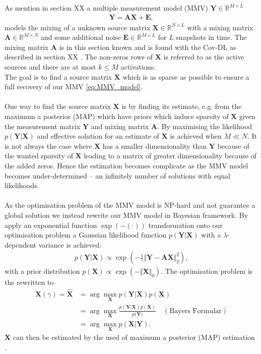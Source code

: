 As mention in section XX a multiple measurement model (MMV) $\mathbf{Y} \in \mathbb{R}^{M \times L}$
\begin{align*}
\mathbf{Y} = \mathbf{AX} + \mathbf{E},
\end{align*}
models the mixing of a unknown source matrix $\mathbf{X} \in \mathbb{R}^{N \times L}$ with a mixing matrix $\mathbf{A} \in \mathbb{R}^{M \times N}$ and some additional noise $\mathbf{E} \in \mathbb{R}^{M \times L}$ for $L$ snapshots in time. The mixing matrix $\mathbf{A}$ is in this section known and is found with the Cov-DL as described in section XX . The non-zeros rows of $\mathbf{X}$ is referred to as the active sources and there are at most $k \leq M$ activations.
\\
The goal is to find a source matrix $\mathbf{X}$ which is as sparse as possible to ensure a full recovery of our MMV \eqref{eq:MMV_model}.
\\ \\
One way to find the source matrix $\mathbf{X}$ is by finding its estimate, e.g. from the maximum a posterior (MAP) which have priors which induce sparsity of $\mathbf{X}$ given the measurement matrix $\mathbf{Y}$ and mixing matrix $\mathbf{A}$. By maximising the likelihood $p(\mathbf{Y} \vert \mathbf{X})$ and effective solution for an estimate of $\mathbf{X}$ is achieved when $M \ll N$. It is not always the case where $\mathbf{X}$ has a smaller dimensionality than $\mathbf{Y}$ because of the wanted sparsity of $\mathbf{X}$ leading to a matrix of greater dimensionality because of the added zeros. Hence the estimation becomes complicate as the MMV model becomes under-determined -- an infinitely number of solutions with equal likelihoods.
\\ \\
As the optimisation problem of the MMV model is NP-hard and not guarantee a global solution we instead rewrite our MMV model in Bayesian framework. By apply an exponential function $\exp(- (\cdot))$ transformation onto our optimisation problem a Gaussian likelihood function $p(\mathbf{Y} \vert \mathbf{X})$ with a $\lambda$-dependent variance is achieved:
\begin{align*}
p(\mathbf{Y} \vert \mathbf{X}) \propto \exp \left( - \frac{1}{\gamma} \Vert \mathbf{Y} - \mathbf{AX} \Vert_2^2 \right),
\end{align*}
with a prior distribution $p(\mathbf{X}) \propto \exp(- \Vert \mathbf{X} \Vert_0)$. The optimisation problem is the rewritten to
\begin{align*}
\mathbf{X} (\gamma) = \hat{\mathbf{X}} &= \arg \max_{\mathbf{X}} p(\mathbf{Y} \vert \mathbf{X}) p(\mathbf{X}) \\
&= \arg \max_{\mathbf{X}} \frac{p(\mathbf{Y} \vert \mathbf{X}) p(\mathbf{X})}{p(\mathbf{Y)}} \quad (\text{Bayers Formular}) \\
&= \arg \max_{\mathbf{X}} p(\mathbf{X} \vert \mathbf{Y}).
\end{align*}
$\mathbf{X}$ can then be estimated by the used of maximum a posterior (MAP) estimation \cite[p. 137]{??}.

